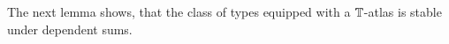 %	
The next lemma shows, that the class of types equipped with a $\mathbb{T}$-atlas is stable under dependent sums.

